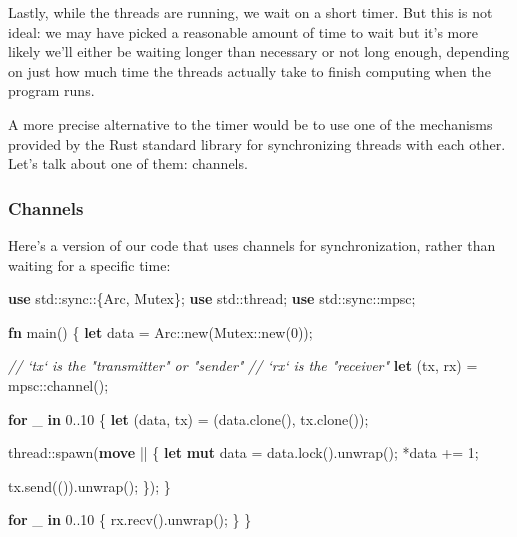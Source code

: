 \documentclass[a4paper,]{book}
\newenvironment{Shaded}{\begin{snugshade}}{\end{snugshade}}
\newcommand{\KeywordTok}[1]{\textcolor[rgb]{0.13,0.29,0.53}{\textbf{{#1}}}}
\newcommand{\DecValTok}[1]{\textcolor[rgb]{0.00,0.00,0.81}{{#1}}}
\newcommand{\CommentTok}[1]{\textcolor[rgb]{0.56,0.35,0.01}{\textit{{#1}}}}
\newcommand{\NormalTok}[1]{{#1}}
\begin{document}
Lastly, while the threads are running, we wait on a short timer. But
this is not ideal: we may have picked a reasonable amount of time to
wait but it's more likely we'll either be waiting longer than necessary
or not long enough, depending on just how much time the threads actually
take to finish computing when the program runs.

A more precise alternative to the timer would be to use one of the
mechanisms provided by the Rust standard library for synchronizing
threads with each other. Let's talk about one of them: channels.

\subsubsection{Channels}\label{channels}

Here's a version of our code that uses channels for synchronization,
rather than waiting for a specific time:

\begin{Shaded}
\begin{Highlighting}[]
\KeywordTok{use} \NormalTok{std::sync::\{Arc, Mutex\};}
\KeywordTok{use} \NormalTok{std::thread;}
\KeywordTok{use} \NormalTok{std::sync::mpsc;}

\KeywordTok{fn} \NormalTok{main() \{}
    \KeywordTok{let} \NormalTok{data = Arc::new(Mutex::new(}\DecValTok{0}\NormalTok{));}

    \CommentTok{// `tx` is the "transmitter" or "sender"}
    \CommentTok{// `rx` is the "receiver"}
    \KeywordTok{let} \NormalTok{(tx, rx) = mpsc::channel();}

    \KeywordTok{for} \NormalTok{_ }\KeywordTok{in} \DecValTok{0.}\NormalTok{.}\DecValTok{10} \NormalTok{\{}
        \KeywordTok{let} \NormalTok{(data, tx) = (data.clone(), tx.clone());}

        \NormalTok{thread::spawn(}\KeywordTok{move} \NormalTok{|| \{}
            \KeywordTok{let} \KeywordTok{mut} \NormalTok{data = data.lock().unwrap();}
            \NormalTok{*data += }\DecValTok{1}\NormalTok{;}

            \NormalTok{tx.send(()).unwrap();}
        \NormalTok{\});}
    \NormalTok{\}}

    \KeywordTok{for} \NormalTok{_ }\KeywordTok{in} \DecValTok{0.}\NormalTok{.}\DecValTok{10} \NormalTok{\{}
        \NormalTok{rx.recv().unwrap();}
    \NormalTok{\}}
\NormalTok{\}}
\end{Highlighting}
\end{Shaded}
\end{document}

